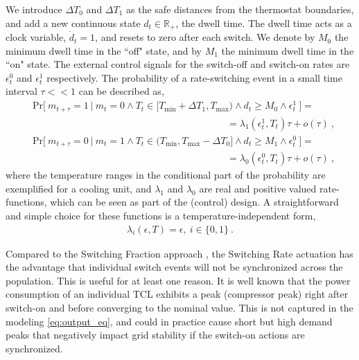 \documentclass[submission,copyright,creativecommons]{eptcs}
\begin{document}
We introduce $\Delta T_0$ and $\Delta T_1$ as the safe distances from the thermostat boundaries, and add a new continuous state $d_t \in \mathbb{R_+}$, the dwell time. The dwell time acts as a clock variable, $\dot{d}_t = 1$, and resets to zero after each switch. We denote by $M_0$ the minimum dwell time in the  ``off" state, and by $M_1$ the minimum dwell time in the ``on" state. The external control signals for the switch-off and switch-on rates are $\epsilon^0_t$ and $\epsilon^1_t$ respectively. The probability of a rate-switching event in a small time interval $\tau<<1$ can be described as,
\begin{subequations}\label{eq:rate_law}
\begin{align}
&\mathrm{Pr}\big[~ m_{t+\tau} = 1 ~\big|~ m_t = 0 \wedge  T_t \in [ T_{\min} +\Delta  T_1, T_{\max}) \wedge d_t \geq M_0 \wedge \epsilon^1_t~\big]=\nonumber \\
&\hspace{240pt} = \lambda_1(\epsilon^{1}_t,T_t) \tau + o(\tau) ~, \label{eq:rate_on_law} \\ &\mathrm{Pr}\big[~ m_{t+\tau} = 0 ~\big|~ m_t = 1 \wedge  T_t \in ( T_{\min}, T_{\max}- \Delta T_{0}] \wedge d_t \geq M_1 \wedge \epsilon^0_t ~\big]= \nonumber \\
&\hspace{240pt}  = \lambda_0(\epsilon^{0}_t,T_t) \tau + o(\tau) ~, \label{eq:rate_off_law} \end{align}
\end{subequations} 
where the temperature ranges in the conditional part of the probability are exemplified for a cooling unit, and $\lambda_1$ and $\lambda_0$ are real and positive valued rate-functions, which can be seen as part of the (control) design. A straightforward and simple choice for these functions is a temperature-independent form,
\begin{align}
	 \lambda_i(\epsilon,T)=\epsilon, ~ i\in \{0,1\}~. \label{eq:simple_rate_functions}
\end{align}


Compared to the Switching Fraction approach \cite{zhang2013aggregated,totu2013control,totu2014demand}, the Switching Rate actuation has the advantage that individual switch events will not be synchronized across the population.
This is useful for at least one reason. It is well known that the power consumption of an individual TCL exhibits a peak (compressor peak) right after switch-on and before converging to the nominal value. This is not captured in the modeling \eqref{eq:output_eq}, and could in practice cause short but high demand peaks that negatively impact grid stability if the switch-on actions are synchronized. 
\end{document}

